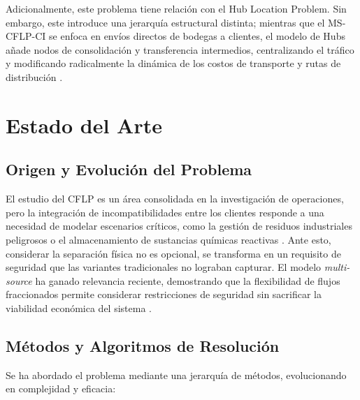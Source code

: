 \documentclass[letter, 10pt]{article}
\begin{document}
Adicionalmente, este problema tiene relación con el Hub Location Problem. Sin embargo, este introduce una jerarquía estructural distinta; mientras que el MS-CFLP-CI se enfoca en envíos directos de bodegas a clientes, el modelo de Hubs añade nodos de consolidación y transferencia intermedios, centralizando el tráfico y modificando radicalmente la dinámica de los costos de transporte y rutas de distribución \cite{Gjergji2025}.

\section{Estado del Arte}

\subsection{Origen y Evolución del Problema}
El estudio del CFLP es un área consolidada en la investigación de operaciones, pero la integración de incompatibilidades entre los clientes responde a una necesidad de modelar escenarios críticos, como la gestión de residuos industriales peligrosos o el almacenamiento de sustancias químicas reactivas \cite{Maia2023, owen1998}. Ante esto, considerar la separación física no es opcional, se transforma en un requisito de seguridad que las variantes tradicionales no lograban capturar. El modelo \textit{multi-source} ha ganado relevancia reciente, demostrando que la flexibilidad de flujos fraccionados permite considerar restricciones de seguridad sin sacrificar la viabilidad económica del sistema \cite{ceschia2024, Gjergji2025}.

\subsection{Métodos y Algoritmos de Resolución}
Se ha abordado el problema mediante una jerarquía de métodos, evolucionando en complejidad y eficacia:
\end{document}
